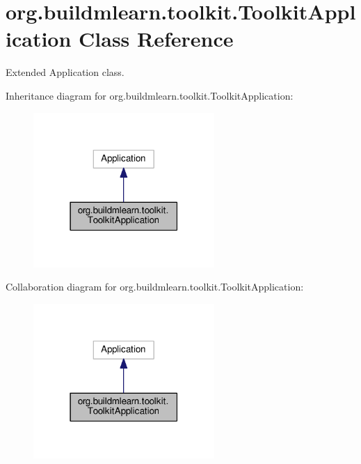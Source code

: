 \hypertarget{classorg_1_1buildmlearn_1_1toolkit_1_1ToolkitApplication}{}\section{org.\+buildmlearn.\+toolkit.\+Toolkit\+Application Class Reference}
\label{classorg_1_1buildmlearn_1_1toolkit_1_1ToolkitApplication}


Extended Application class.  




Inheritance diagram for org.\+buildmlearn.\+toolkit.\+Toolkit\+Application\+:
\nopagebreak
\begin{figure}[H]
\begin{center}
\leavevmode
\includegraphics[width=195pt]{classorg_1_1buildmlearn_1_1toolkit_1_1ToolkitApplication__inherit__graph}
\end{center}
\end{figure}


Collaboration diagram for org.\+buildmlearn.\+toolkit.\+Toolkit\+Application\+:
\nopagebreak
\begin{figure}[H]
\begin{center}
\leavevmode
\includegraphics[width=195pt]{classorg_1_1buildmlearn_1_1toolkit_1_1ToolkitApplication__coll__graph}
\end{center}
\end{figure}
